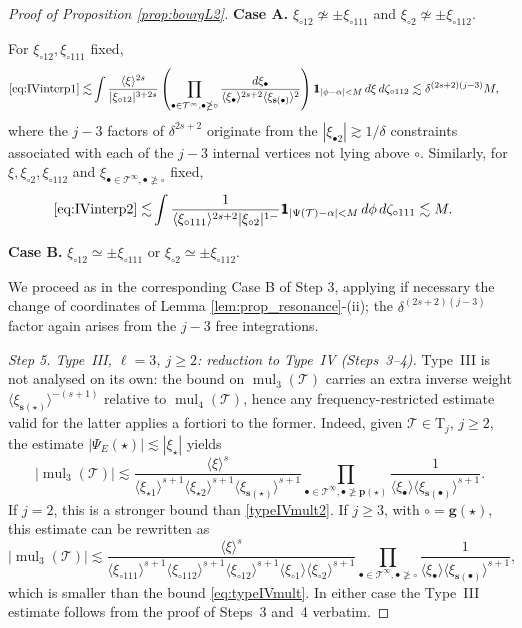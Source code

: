 \documentclass[a4paper,
11pt,  reqno]{amsart}
\newcommand{\mathbbm}[1]{\mathchoice%
    {\hbox{\sffamily 1\kern-.40em 1}}%
    {\hbox{\sffamily 1\kern-.40em 1}}%
    {\hbox{\scriptsize\sffamily 1\kern-.30em 1}}%
    {\hbox{\tiny\sffamily 1\kern-.25em 1}}}%
\newcommand{\jap}[1]{\langle #1 \rangle}
\newcommand{\5}{\textup{V}}
\newcommand{\noi}{\noindent}
\newcommand{\ind}{\mathbbm 1}
\theoremstyle{remark}
\newcommand{\bul}{\bullet}
\newcommand{\TT}{\mathcal{T}}
\newcommand{\Tr}{\mathrm{T}}
\newcommand{\pb}{\mathbf{p}}
\newcommand{\gb}{\mathbf{g}}
\newcommand{\sbf}{\mathbf{s}}
\DeclareMathOperator{\mul}{mul}
\numberwithin{equation}{section}
\numberwithin{theorem}{section}
\begin{document}
\begin{proof}[Proof of Proposition \ref{prop:bourgL2}]
\smallskip
\noi\textbf{Case A.} $\xi_{\circ12}\not\simeq \pm \xi_{\circ111}$ and $\xi_{\circ2}\not\simeq \pm \xi_{\circ112}$.

\noi For $\xi_{\circ12}, \xi_{\circ111}$ fixed,
\begin{align*}
\eqref{eq:IVinterp1}\lesssim & \int \frac{\jap{\xi}^{2s}}{|\xi_{\circ12}|^{3+2s}}\left(\prod_{\bul\in\TT^\infty, \bul\ngeq\circ} \frac{d\xi_\bul}{\jap{\xi_\bul}^{2s+2}\jap{\xi_{\sbf(\bul)}}^2}\right) \ind_{|\phi-\alpha|<M}\,d\xi\, d\zeta_{\circ112}\lesssim \delta^{(2s+2)(j-3)}M,
\end{align*}
where the $j-3$ factors of $\delta^{2s+2}$ originate from the $|\xi_{\bul 2}|\gtrsim 1/\delta$ constraints associated with each of the $j-3$ internal vertices not lying above $\circ$.
Similarly, for $\xi, \xi_{\circ2}, \xi_{\circ112}$ and $\xi_{\bul\in \TT^\infty, \bul\ngeq \circ}$ fixed,
\begin{align*}
\eqref{eq:IVinterp2} \lesssim & \int \frac{1}{\jap{\xi_{\circ111}}^{2s+2}|\xi_{\circ2}|^{1-}}\ind_{|\Psi(\TT)-\alpha|<M}\, d\phi\, d\zeta_{\circ111} \lesssim M.
\end{align*}

\smallskip
\noi
\textbf{Case B.} $\xi_{\circ12}\simeq \pm \xi_{\circ111}$ or $\xi_{\circ2}\simeq \pm \xi_{\circ112}$.

\noi We proceed as in the corresponding Case B of Step 3, applying if necessary the change of coordinates of Lemma \ref{lem:prop_resonance}-(ii); the $\delta^{(2s+2)(j-3)}$ factor again arises from the $j-3$ free integrations.

\medskip
\noi\textit{Step 5. Type~III, $\ell=3$, $j\ge 2$: reduction to Type~IV (Steps~3--4).}
Type~III is not analysed on its own: the bound on $\mul_3(\TT)$ carries an extra inverse weight $\jap{\xi_{\sbf(\star)}}^{-(s+1)}$ relative to $\mul_4(\TT)$, hence any frequency-restricted estimate valid for the latter applies a fortiori to the former.
Indeed, given $\TT\in \Tr_j$, $j\ge 2$, the estimate $|\Psi_E(\star)|\lesssim |\xi_\star|$ yields
$$
|\mul_3(\TT)|\lesssim \frac{\jap{\xi}^{s}}{\jap{\xi_{\star1}}^{s+1}\jap{\xi_{\star2}}^{s+1}\jap{\xi_{\sbf(\star)}}^{s+1}}\prod_{\bul \in \TT^\infty, \bul\ngeq \pb(\star)}\frac{1}{\jap{\xi_{\bul}}\jap{\xi_{\sbf(\bul)}}^{s+1}}.
$$
If $j=2$, this is a stronger bound than \eqref{typeIVmult2}.
If $j\ge 3$, with $\circ=\gb(\star)$, this estimate can be rewritten as
$$
|\mul_3(\TT)|\lesssim \frac{\jap{\xi}^s}{\jap{\xi_{\circ111}}^{s+1}\jap{\xi_{\circ112}}^{s+1}\jap{\xi_{\circ12}}^{s+1}\jap{\xi_{\circ1}}\jap{\xi_{\circ2}}^{s+1}} \prod_{\bul \in \TT^\infty, \bul\ngeq \circ}\frac{1}{\jap{\xi_{\bul}}\jap{\xi_{\sbf(\bul)}}^{s+1}},
$$
which is smaller than the bound \eqref{eq:typeIVmult}. In either case the Type~III estimate follows from the proof of Steps~3 and~4 verbatim.


\end{proof}
\end{document}

